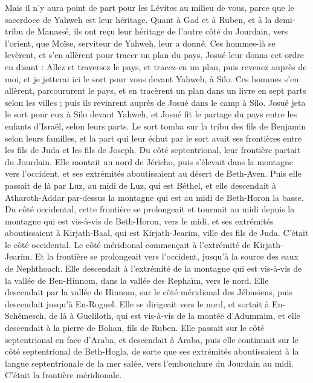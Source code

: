 \begin{multicols}{2}
Mais il n’y aura point de part pour les Lévites au milieu de vous, parce que le sacerdoce de Yahweh est leur héritage. Quant à Gad et à Ruben, et à la demi-tribu de Manassé, ils ont reçu leur héritage de l’autre côté du Jourdain, vers l’orient, que Moïse, serviteur de Yahweh, leur a donné.
Ces hommes-là se levèrent, et s’en allèrent pour tracer un plan du pays, Josué leur donna cet ordre en disant : Allez et traversez le pays, et tracez-en un plan, puis revenez auprès de moi, et je jetterai ici le sort pour vous devant Yahweh, à Silo.
Ces hommes s’en allèrent, parcoururent le pays, et en tracèrent un plan dans un livre en sept parts selon les villes ; puis ils revinrent auprès de Josué dans le camp à Silo.
Josué jeta le sort pour eux à Silo devant Yahweh, et Josué fit le partage du pays entre les enfants d’Israël, selon leurs parts.
Le sort tomba sur la tribu des fils de Benjamin selon leurs familles, et la part qui leur échut par le sort avait ses frontières entre les fils de Juda et les fils de Joseph.
Du côté septentrional, leur frontière partait du Jourdain. Elle montait au nord de Jéricho, puis s’élevait dans la montagne vers l’occident, et ses extrémités aboutissaient au désert de Beth-Aven.
Puis elle passait de là par Luz, au midi de Luz, qui est Béthel, et elle descendait à Atharoth-Addar par-dessus la montagne qui est au midi de Beth-Horon la basse.
Du côté occidental, cette frontière se prolongeait et tournait au midi depuis la montagne qui est vis-à-vis de Beth-Horon, vers le midi, et ses extrémités aboutissaient à Kirjath-Baal, qui est Kirjath-Jearim, ville des fils de Juda. C’était le côté occidental.
Le côté méridional commençait à l’extrémité de Kirjath-Jearim. Et la frontière se prolongeait vers l’occident, jusqu’à la source des eaux de Nephthoach.
Elle descendait à l’extrémité de la montagne qui est vis-à-vis de la vallée de Ben-Hinnom, dans la vallée des Rephaïm, vers le nord. Elle descendait par la vallée de Hinnom, sur le côté méridional des Jébusiens, puis descendait jusqu’à En-Roguel.
Elle se dirigeait vers le nord, et sortait à En-Schémesch, de là à Gueliloth, qui est vis-à-vis de la montée d’Adummim, et elle descendait à la pierre de Bohan, fils de Ruben.
Elle passait sur le côté septentrional en face d’Araba, et descendait à Araba,
puis elle continuait sur le côté septentrional de Beth-Hogla, de sorte que ses extrémités aboutissaient à la langue septentrionale de la mer salée, vers l’embouchure du Jourdain au midi. C’était la frontière méridionale.

\end{multicols}
